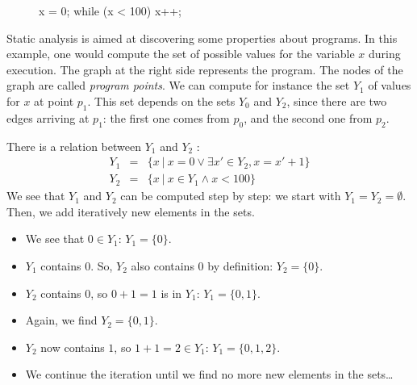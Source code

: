 \documentclass[a4paper,english,titlepage,11pt]{report}
\begin{document}
\begin{figure}[!h]
   \begin{minipage}[c]{.46\linewidth}
\begin{C}
x = 0;
while (x < 100) {
	x++;
}
\end{C}
   \end{minipage} \hfill
   \begin{minipage}[c]{.46\linewidth}
   \end{minipage}
\end{figure}
\FloatBarrier

Static analysis is aimed at discovering some properties about programs. In this
example, one would compute the set of possible values for the variable $x$
during execution.
The graph at the right side represents the program. The nodes of the graph are
called \emph{program points}. We can compute for instance the set $Y_1$ of
values for $x$ at point $p_1$. This set depends on the sets $Y_0$ and $Y_2$,
since there are two edges arriving at $p_1$: the first one comes from $p_0$, and
the second one from $p_2$.

There is a relation between $Y_1$ and $Y_2$ :
\begin{eqnarray*}
Y_1 &=& \{x\ |\ x=0 \vee \exists x' \in Y_2, x=x'+1 \} \\
Y_2 &=& \{x\ |\ x \in Y_1 \wedge x < 100 \}
\end{eqnarray*}
We see that $Y_1$ and $Y_2$ can be computed step by step:
we start with $Y_1 = Y_2 = \emptyset$.
Then, we add iteratively new elements in the sets.
\begin{itemize}
\item  We see that $0 \in Y_1$: $Y_1 = \{0\}$.
\item $Y_1$ contains $0$. So, $Y_2$ also contains $0$ by definition: $Y_2 =
\{0\}$.
\item $Y_2$ contains $0$, so $0+1=1$ is in $Y_1$: $Y_1 = \{0,1\}$.
\item Again, we find $Y_2 = \{0,1\}$.
\item $Y_2$ now contains $1$, so $1+1=2 \in Y_1$: $Y_1 = \{0,1,2\}$.
\item We continue the iteration until we find no more new elements in the
sets\dots
\end{itemize}
\end{document}
